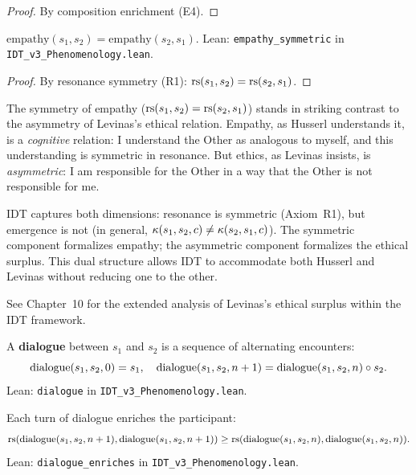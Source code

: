 \begin{proof}
By composition enrichment (E4).
\end{proof}

\begin{theorem}
\label{thm:empathy-symmetric}
$\mathrm{empathy}(s_1, s_2) = \mathrm{empathy}(s_2, s_1)$.
Lean: \texttt{empathy\_symmetric} in \texttt{IDT\_v3\_Phenomenology.lean}.
\end{theorem}

\begin{proof}
By resonance symmetry (R1): $\mathrm{rs}(s_1, s_2) = \mathrm{rs}(s_2, s_1)$.
\end{proof}

\begin{interpretation}
\label{interp:empathy-ethics}
The symmetry of empathy ($\mathrm{rs}(s_1, s_2) = \mathrm{rs}(s_2, s_1)$) stands in
striking contrast to the asymmetry of Levinas's ethical relation.  Empathy,
as Husserl understands it, is a \emph{cognitive} relation: I understand the
Other as analogous to myself, and this understanding is symmetric in resonance.
But ethics, as Levinas insists, is \emph{asymmetric}: I am responsible for
the Other in a way that the Other is not responsible for me.

IDT captures both dimensions: resonance is symmetric (Axiom~R1), but emergence
is not (in general, $\kappa(s_1, s_2, c) \neq \kappa(s_2, s_1, c)$).  The
symmetric component formalizes empathy; the asymmetric component formalizes
the ethical surplus.  This dual structure allows IDT to accommodate both
Husserl and Levinas without reducing one to the other.

See Chapter~10 for the extended analysis of Levinas's ethical surplus within
the IDT framework.
\end{interpretation}

\begin{definition}[Dialogue]
\label{def:dialogue}
A \textbf{dialogue} between $s_1$ and $s_2$ is a sequence of alternating
encounters:
\[
\mathrm{dialogue}(s_1, s_2, 0) = s_1, \quad
\mathrm{dialogue}(s_1, s_2, n+1) = \mathrm{dialogue}(s_1, s_2, n) \circ s_2.
\]
Lean: \texttt{dialogue} in \texttt{IDT\_v3\_Phenomenology.lean}.
\end{definition}

\begin{theorem}
\label{thm:dialogue-enriches}
Each turn of dialogue enriches the participant:
\[
\mathrm{rs}(\mathrm{dialogue}(s_1, s_2, n+1), \mathrm{dialogue}(s_1, s_2, n+1))
\geq \mathrm{rs}(\mathrm{dialogue}(s_1, s_2, n), \mathrm{dialogue}(s_1, s_2, n)).
\]
Lean: \texttt{dialogue\_enriches} in \texttt{IDT\_v3\_Phenomenology.lean}.
\end{theorem}

